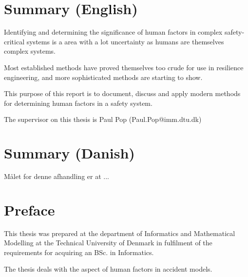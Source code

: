 \documentclass[10pt,oneside]{book}                  %
\begin{document}
\prefrontmatter
\frontmatter



\chapter{Summary (English)}
Identifying and determining the significance of human factors in complex safety-critical systems is a area with a lot uncertainty as humans are themselves complex systems.

Most established methods have proved themselves too crude for use in resilience engineering, and more sophisticated methods are starting to show.

This purpose of this report is to document, discuss and apply modern methods for determining human factors in a safety system.


The supervisor on this thesis is Paul Pop (Paul.Pop@imm.dtu.dk)

\markboth{}{}                                       %
\chapter{Summary (Danish)}

Målet for denne afhandling er at ...

\markboth{}{}                                       %

\chapter{Preface}

This thesis was prepared at the department of Informatics and Mathematical Modelling at the Technical University of Denmark in fulfilment of the requirements for acquiring an BSc. in Informatics. 

The thesis deals with the aspect of human factors in accident models.
\end{document}
